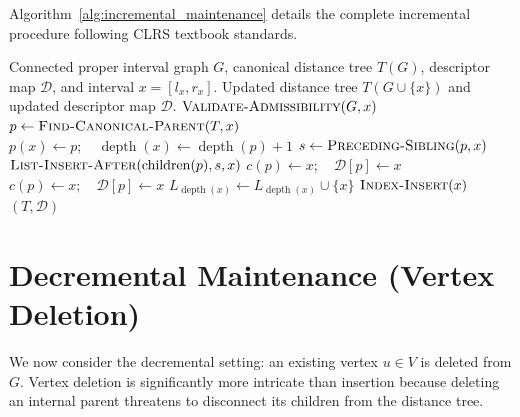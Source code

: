 Algorithm~\ref{alg:incremental_maintenance} details the complete incremental procedure following CLRS textbook standards.

\begin{algorithm}[htbp]
\caption{\textsc{Dynamic-Vertex-Insert}$(G, T, \mathcal{D}, x)$}
\label{alg:incremental_maintenance}
\begin{algorithmic}[1]
\Require Connected proper interval graph $G$, canonical distance tree $T(G)$, descriptor map $\mathcal{D}$, and interval $x = [l_x, r_x]$.
\Ensure Updated distance tree $T(G \cup \{x\})$ and updated descriptor map $\mathcal{D}$.
\State $\textsc{Validate-Admissibility}(G, x)$ 
\State $p \leftarrow \textsc{Find-Canonical-Parent}(T, x)$ 
\State $p(x) \leftarrow p; \quad \operatorname{depth}(x) \leftarrow \operatorname{depth}(p) + 1$
\State $s \leftarrow \textsc{Preceding-Sibling}(p, x)$ 
\State $\textsc{List-Insert-After}(\operatorname{children}(p), s, x)$ 
 
    \State $c(p) \leftarrow x; \quad \mathcal{D}[p] \leftarrow x$
 
    \State $c(p) \leftarrow x; \quad \mathcal{D}[p] \leftarrow x$
\EndIf {}
\State $L_{\operatorname{depth}(x)} \leftarrow L_{\operatorname{depth}(x)} \cup \{x\}$ 
\State $\textsc{Index-Insert}(x)$ 
\State \Return $(T, \mathcal{D})$
\end{algorithmic}
\end{algorithm}

\section{Decremental Maintenance (Vertex Deletion)}
\label{sec:dynamic_decremental}

We now consider the decremental setting: an existing vertex $u \in V$ is deleted from $G$. Vertex deletion is significantly more intricate than insertion because deleting an internal parent threatens to disconnect its children from the distance tree.

